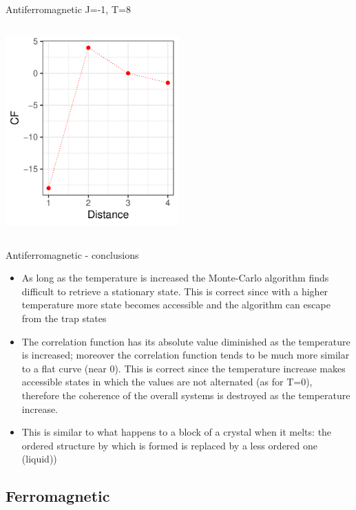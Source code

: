 \documentclass{beamer}
\begin{document}
\begin{frame}{Antiferromagnetic J=-1, T=8}
\begin{columns}
\begin{column}{0.5\textwidth}
\begin{center}
     \end{center}
     \begin{center}
     \includegraphics[width=0.5\textwidth]{Pic/J-1_60_2500_T=8_CORRELATION.pdf}
     \end{center}
\end{column}
\end{columns}
\end{frame}

\begin{frame}{Antiferromagnetic - conclusions}
\begin{itemize}
\item As long as the temperature is increased the Monte-Carlo algorithm finds difficult to retrieve a stationary state. This is correct since with a higher temperature more state becomes accessible and the algorithm can escape from the trap states
\item The correlation function has its absolute value diminished as the temperature is increased; moreover the correlation function tends to be much more similar to a flat curve (near 0). This is correct since the temperature increase makes accessible states in which the values are not alternated (as for T=0), therefore the coherence of the overall systems is destroyed as the temperature increase. \item This is similar to what happens to a block of a crystal when it melts: the ordered structure by which is formed is replaced by a less ordered one (liquid))
\end{itemize}
\end{frame}

\subsection{Ferromagnetic}
\end{document}
